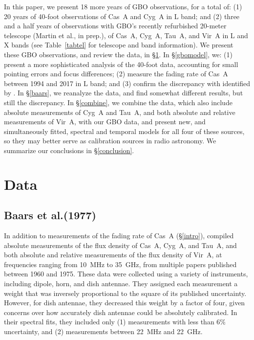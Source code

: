 \documentclass[fleqn,usenatbib]{mnras}
\begin{document}
In this paper, we present 18 more years of GBO observations, for a total of:  (1) 20 years of 40-foot observations of Cas~A and Cyg~A in L band; and (2) three and a half years of observations with GBO's recently refurbished 20-meter telescope (Martin et al., in prep.), of Cas~A, Cyg~A, Tau~A, and Vir~A in L and X bands (see Table~\ref{tabtel} for telescope and band information).  We present these GBO observations, and review the \citet{b77} data, in \S\ref{data}.  In \S\ref{gbomodel}, we:  (1) present a more sophisticated analysis of the 40-foot data, accounting for small pointing errors and focus differences; (2) measure the fading rate of Cas~A between 1994 and 2017 in L band; and (3) confirm the discrepancy with \citet{b77} identified by \cite{r00}.  In \S\ref{baars}, we reanalyze the \citet{b77} data, and find somewhat different results, but still the discrepancy.  In \S\ref{combine}, we combine the \citet{b77} data, which also include absolute measurements of Cyg~A and Tau~A, and both absolute and relative measurements of Vir~A, with our GBO data, and present new, and simultaneously fitted, spectral and temporal models for all four of these sources, so they may better serve as calibration sources in radio astronomy.  We summarize our conclusions in \S\ref{conclusion}.



\section{Data}\label{data}



\subsection{Baars et al.\@ (1977)}\label{historical}



In addition to measurements of the fading rate of Cas~A (\S\ref{intro}), \citet{b77} compiled absolute measurements of the flux density of Cas~A, Cyg~A, and Tau~A, and both absolute and relative measurements of the flux density of Vir~A, at frequencies ranging from 10~MHz to 35~GHz, from multiple papers published between 1960 and 1975.  These data were collected using a variety of instruments, including dipole, horn, and dish antennae.  They assigned each measurement a weight that was inversely proportional to the square of its published uncertainty.  However, for dish antennae, they decreased this weight by a factor of four, given concerns over how accurately dish antennae could be absolutely calibrated.  In their spectral fits, they included only (1) measurements with less than $6\%$ uncertainty, and (2) measurements between 22~MHz and 22~GHz. 
\end{document}
